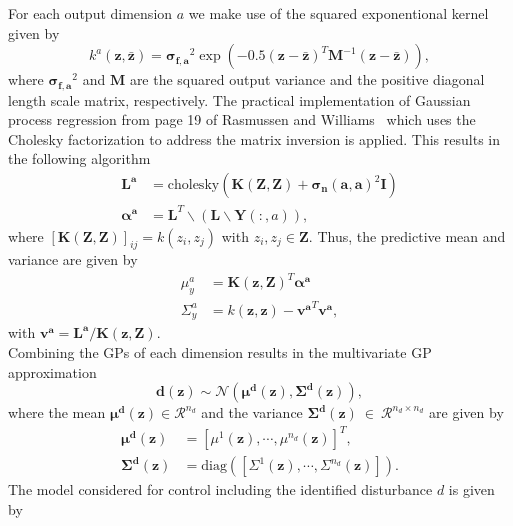 \documentclass[letterpaper, 10 pt, conference]{ieeeconf}  %
\begin{document}
For each output dimension $a$ we make use of the squared exponentional kernel given by
\begin{equation}
k^a(\boldsymbol{z},\boldsymbol{\bar{z}}) = \boldsymbol{\sigma_{f,a}}^2 \exp(-0.5(\boldsymbol{z}-\boldsymbol{\bar{z}})^T \boldsymbol{M}^{-1} (\boldsymbol{z}-\boldsymbol{\bar{z}})),
\end{equation}
where $\boldsymbol{\sigma_{f,a}}^2$ and $\boldsymbol{M}$ are the squared output variance and the positive diagonal length scale matrix, respectively.
The practical implementation of Gaussian process regression from page 19 of Rasmussen and Williams~\cite{williams2006gaussian} which uses the Cholesky factorization to address the matrix inversion is applied. This results in the following algorithm
\begin{align}
\boldsymbol{L^a} &= \text{cholesky}(\boldsymbol{K}(\boldsymbol{Z},\boldsymbol{Z}) + \boldsymbol{\sigma_n(a,a)}^2\boldsymbol{I})\\
\boldsymbol{\alpha^a} &= \boldsymbol{L}^T\backslash(\boldsymbol{L} \backslash \boldsymbol{Y}(:,a)),
\end{align}
where $[\boldsymbol{K}(\boldsymbol{Z},\boldsymbol{Z})]_{ij}=k(z_i,z_j)$ with $z_i, z_j \in \boldsymbol{Z}$.
Thus, the predictive mean and variance are given by
\begin{align}
\mu_y^a&=\boldsymbol{K}(\boldsymbol{z},\boldsymbol{Z})^T\boldsymbol{\alpha^a}\\
\Sigma_y^a&=k(\boldsymbol{z},\boldsymbol{z})-\boldsymbol{v^a}^T\boldsymbol{v^a},
\end{align}
with $\boldsymbol{v^a}=\boldsymbol{L^a}/\boldsymbol{K(z,Z)}$.\\
Combining the GPs of each dimension results in the multivariate GP approximation 
\begin{equation}
\boldsymbol{d}(\boldsymbol{z})\sim \mathcal{N}(\boldsymbol{\mu^d}(\boldsymbol{z}),\boldsymbol{\Sigma^d}(\boldsymbol{z})),
\end{equation}
where the mean $\boldsymbol{\mu^d(z)} \in \mathcal{R}^{n_d}$ and the variance $\boldsymbol{\Sigma^d(z)}~\in~\mathcal{R}^{n_d \times n_d}$ are given by
\begin{align}
\boldsymbol{\mu^d}(\boldsymbol{z}) &= [\mu^1(\boldsymbol{z}),\cdots, \mu^{n_d}(\boldsymbol{z})]^T,\\
\boldsymbol{\Sigma^d}(\boldsymbol{z}) &= \text{diag}([\Sigma^1(\boldsymbol{z}),\cdots, \Sigma^{n_d}(\boldsymbol{z})]).
\end{align}
The model considered for control including the identified disturbance $d$ is given by
\end{document}
